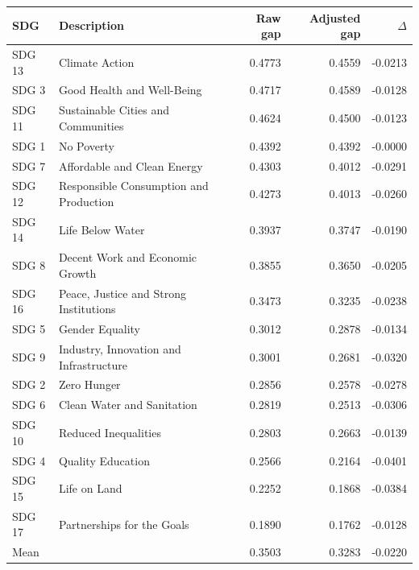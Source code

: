 \begin{tabular}{llrrr}
\toprule
SDG & Description & Raw gap & Adjusted gap & $\Delta$ \\
\midrule
SDG 13 & Climate Action & 0.4773 & 0.4559 & -0.0213 \\
SDG  3 & Good Health and Well-Being & 0.4717 & 0.4589 & -0.0128 \\
SDG 11 & Sustainable Cities and Communities & 0.4624 & 0.4500 & -0.0123 \\
SDG  1 & No Poverty & 0.4392 & 0.4392 & -0.0000 \\
SDG  7 & Affordable and Clean Energy & 0.4303 & 0.4012 & -0.0291 \\
SDG 12 & Responsible Consumption and Production & 0.4273 & 0.4013 & -0.0260 \\
SDG 14 & Life Below Water & 0.3937 & 0.3747 & -0.0190 \\
SDG  8 & Decent Work and Economic Growth & 0.3855 & 0.3650 & -0.0205 \\
SDG 16 & Peace, Justice and Strong Institutions & 0.3473 & 0.3235 & -0.0238 \\
SDG  5 & Gender Equality & 0.3012 & 0.2878 & -0.0134 \\
SDG  9 & Industry, Innovation and Infrastructure & 0.3001 & 0.2681 & -0.0320 \\
SDG  2 & Zero Hunger & 0.2856 & 0.2578 & -0.0278 \\
SDG  6 & Clean Water and Sanitation & 0.2819 & 0.2513 & -0.0306 \\
SDG 10 & Reduced Inequalities & 0.2803 & 0.2663 & -0.0139 \\
SDG  4 & Quality Education & 0.2566 & 0.2164 & -0.0401 \\
SDG 15 & Life on Land & 0.2252 & 0.1868 & -0.0384 \\
SDG 17 & Partnerships for the Goals & 0.1890 & 0.1762 & -0.0128 \\
\midrule
\multicolumn{2}{l}{Mean} & 0.3503 & 0.3283 & -0.0220 \\
\bottomrule
\end{tabular}
